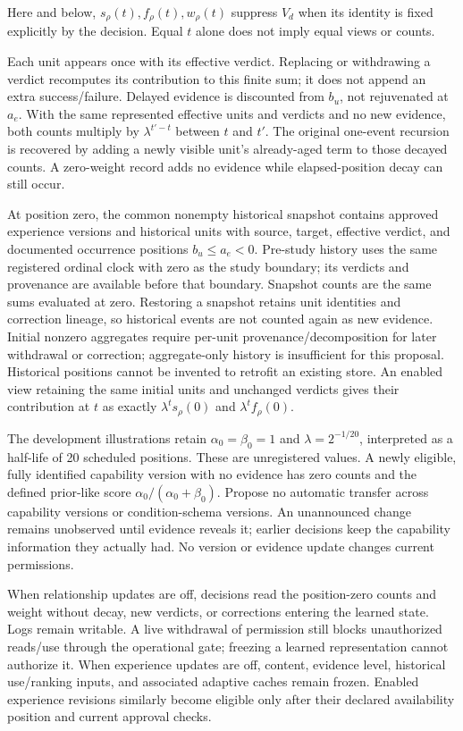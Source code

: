 \documentclass[
  english,
  11pt,
]{article}
\newcounter{none} %
\begin{document}
Here and below, \(s_\rho(t),f_\rho(t),w_\rho(t)\) suppress \(V_d\) when
its identity is fixed explicitly by the decision. Equal \(t\) alone does
not imply equal views or counts.

Each unit appears once with its effective verdict. Replacing or
withdrawing a verdict recomputes its contribution to this finite sum; it
does not append an extra success/failure. Delayed evidence is discounted
from \(b_u\), not rejuvenated at \(a_e\). With the same represented
effective units and verdicts and no new evidence, both counts multiply
by \(\lambda^{t'-t}\) between \(t\) and \(t'\). The original one-event
recursion is recovered by adding a newly visible unit's already-aged
term to those decayed counts. A zero-weight record adds no evidence
while elapsed-position decay can still occur.

At position zero, the common nonempty historical snapshot contains
approved experience versions and historical units with source, target,
effective verdict, and documented occurrence positions
\(b_u\leq a_e<0\). Pre-study history uses the same registered ordinal
clock with zero as the study boundary; its verdicts and provenance are
available before that boundary. Snapshot counts are the same sums
evaluated at zero. Restoring a snapshot retains unit identities and
correction lineage, so historical events are not counted again as new
evidence. Initial nonzero aggregates require per-unit
provenance/decomposition for later withdrawal or correction;
aggregate-only history is insufficient for this proposal. Historical
positions cannot be invented to retrofit an existing store. An enabled
view retaining the same initial units and unchanged verdicts gives their
contribution at \(t\) as exactly \(\lambda^t s_\rho(0)\) and
\(\lambda^t f_\rho(0)\).

The development illustrations retain \(\alpha_0=\beta_0=1\) and
\(\lambda=2^{-1/20}\), interpreted as a half-life of 20 scheduled
positions. These are unregistered values. A newly eligible, fully
identified capability version with no evidence has zero counts and the
defined prior-like score \(\alpha_0/(\alpha_0+\beta_0)\). Propose no
automatic transfer across capability versions or condition-schema
versions. An unannounced change remains unobserved until evidence
reveals it; earlier decisions keep the capability information they
actually had. No version or evidence update changes current permissions.

When relationship updates are off, decisions read the position-zero
counts and weight without decay, new verdicts, or corrections entering
the learned state. Logs remain writable. A live withdrawal of permission
still blocks unauthorized reads/use through the operational gate;
freezing a learned representation cannot authorize it. When experience
updates are off, content, evidence level, historical use/ranking inputs,
and associated adaptive caches remain frozen. Enabled experience
revisions similarly become eligible only after their declared
availability position and current approval checks.
\end{document}

